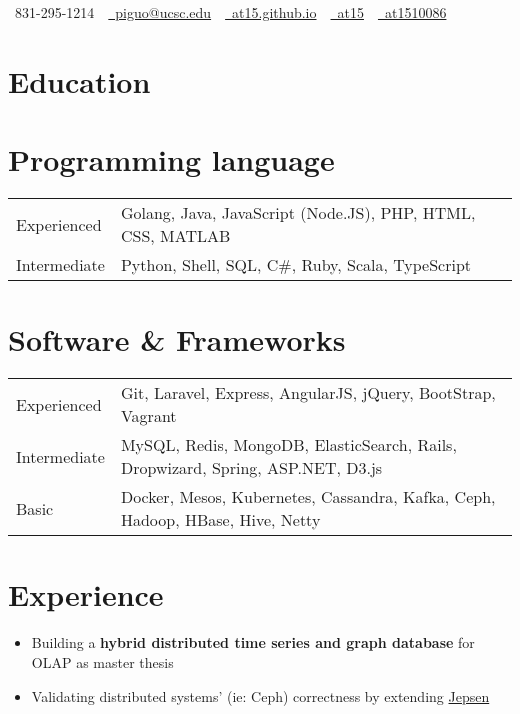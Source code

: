 \documentclass[10pt, letterpaper]{simple-cv}
\begin{document}
\centerline{\faMobile\ 831-295-1214\ \
\href{mailto:piguo@ucsc.edu}{\faEnvelope\ piguo@ucsc.edu}\ \
\href{https://at15.github.io}{\faHome\ at15.github.io}\ \
\href{https://github.com/at15}{\faGithubSquare\ at15}\ \
\href{https://www.linkedin.com/in/at1510086}{\faLinkedinSquare\ at1510086}}

\section{Education}

\section{Programming language}
\begin{tabular}{ l l }
 Experienced & Golang, Java, JavaScript (Node.JS), PHP, HTML, CSS, MATLAB \\
 Intermediate & Python, Shell, SQL, C\#, Ruby,  Scala, TypeScript \\
\end{tabular}

\section{Software \& Frameworks}
\begin{tabular}{ l l }
 Experienced & Git, Laravel, Express, AngularJS, jQuery, BootStrap, Vagrant \\
 Intermediate & MySQL, Redis, MongoDB, ElasticSearch, Rails, Dropwizard, Spring, ASP.NET, D3.js  \\
 Basic & Docker, Mesos, Kubernetes, Cassandra, Kafka, Ceph, Hadoop, HBase, Hive, Netty
\end{tabular}

\section{Experience}
\begin{itemize}
\item Building a \textbf{hybrid distributed time series and graph database} for OLAP as master thesis
\item Validating distributed systems' (ie: Ceph) correctness by extending \href{http://jepsen.io/}{Jepsen}
\end{itemize}
\end{document}
